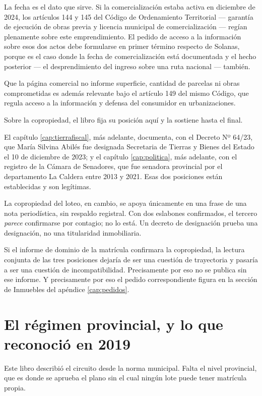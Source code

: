 La fecha es el dato que sirve. Si la comercialización estaba activa en diciembre de 2024, los artículos 144 y 145 del Código de Ordenamiento Territorial --- garantía de ejecución de obras previa y licencia municipal de comercialización --- regían plenamente sobre este emprendimiento. El pedido de acceso a la información sobre esos dos actos debe formularse en primer término respecto de Solanas, porque es el caso donde la fecha de comercialización está documentada y el hecho posterior --- el desprendimiento del ingreso sobre una ruta nacional --- también.

Que la página comercial no informe superficie, cantidad de parcelas ni obras comprometidas es además relevante bajo el artículo 149 del mismo Código, que regula acceso a la información y defensa del consumidor en urbanizaciones.

Sobre la copropiedad, el libro fija su posición aquí y la sostiene hasta el final.

El capítulo \ref{cap:tierrafiscal}, más adelante, documenta, con el Decreto Nº 64/23, que María Silvina Abilés fue designada Secretaria de Tierras y Bienes del Estado el 10 de diciembre de 2023; y el capítulo \ref{cap:politica}, más adelante, con el registro de la Cámara de Senadores, que fue senadora provincial por el departamento La Caldera entre 2013 y 2021. Esas dos posiciones están establecidas y son legítimas.

La copropiedad del loteo, en cambio, se apoya únicamente en una frase de una nota periodística, sin respaldo registral. Con dos eslabones confirmados, el tercero \textit{parece} confirmarse por contagio; no lo está. Un decreto de designación prueba una designación, no una titularidad inmobiliaria.

Si el informe de dominio de la matrícula confirmara la copropiedad, la lectura conjunta de las tres posiciones dejaría de ser una cuestión de trayectoria y pasaría a ser una cuestión de incompatibilidad. Precisamente por eso no se publica sin ese informe. Y precisamente por eso el pedido correspondiente figura en la sección de Inmuebles del apéndice \ref{cap:pedidos}.

\section{El régimen provincial, y lo que reconoció en 2019}

Este libro describió el circuito desde la norma municipal. Falta el nivel provincial, que es donde se aprueba el plano sin el cual ningún lote puede tener matrícula propia.

